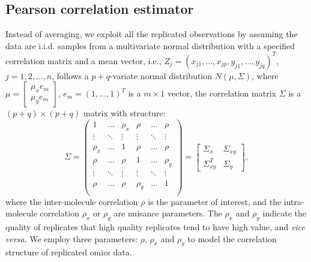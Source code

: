 \documentclass[a4paper]{article}
\begin{document}
\subsection{Pearson correlation estimator}
Instead of averaging, we exploit all the replicated
observations by assuming the data are i.i.d. samples from a
multivariate normal distribution with a specified correlation matrix
and a mean vector, i.e.,
$Z_{j}=(x_{j1},\dots,x_{jp},y_{j1},\dots,y_{jq})^{T}$, $j=1,2,\dots,
n$, follows a $p+q$-variate normal distribution $N(\mu,\Sigma)$,
where
$\mu=\left[\begin{array}{ll}\mu_{x}e_{m}\\
\mu_{y}e_{m}\end{array}\right]$, $e_{m}=(1,\dots,1)^{T}$ is a $m
\times 1$ vector, the correlation matrix $\Sigma$ is a $(p+q) \times
(p+q)$ matrix with structure:\\
\begin{equation} \label{eq:model}
\Sigma=\left( \begin{array}{llllll}
1&\ldots&\rho_{x}&\rho&\ldots&\rho\\
\vdots& \ddots & \vdots&\vdots&\ddots & \vdots\\
\rho_{x}&\ldots&1&\rho&\ldots&\rho\\
\rho&\ldots&\rho&1&\ldots&\rho_{y}\\
\vdots& \ddots & \vdots&\vdots&\ddots & \vdots\\
\rho&\ldots&\rho&\rho_{y}&\ldots&1\\
\end{array} \right)=\left[ \begin{array}{ll}
\Sigma_{x}&\Sigma_{xy}\\
\Sigma_{xy}^{T}&\Sigma_{y}
\end{array} \right],
\end{equation}
where the inter-molecule correlation $\rho$ is the parameter of
interest, and the intra-molecule correlation $\rho_{x}$ or
$\rho_{y}$ are nuisance parameters. The $\rho_{x}$ and $\rho_{y}$
indicate the quality of replicates that high quality replicates tend
to have high value, and {\it vice versa}. We employ three
parameters: $\rho$, $\rho_{x}$ and $\rho_{y}$ to model the
correlation structure of replicated omics data.
\end{document}
